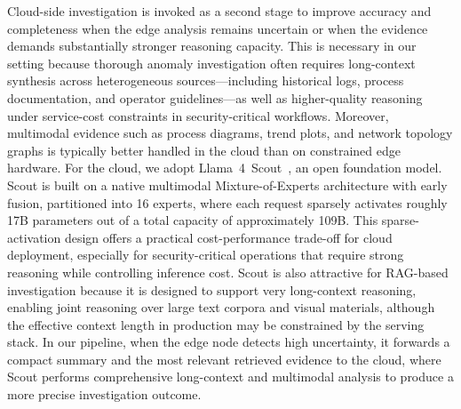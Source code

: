 \documentclass[pdflatex,sn-mathphys-num]{sn-jnl}%
\theoremstyle{thmstyleone}
\theoremstyle{thmstyletwo}%
\theoremstyle{thmstylethree}%
\begin{document}
Cloud-side investigation is invoked as a second stage to improve accuracy and completeness when the edge analysis remains uncertain or when the evidence demands substantially stronger reasoning capacity. This is necessary in our setting because thorough anomaly investigation often requires long-context synthesis across heterogeneous sources---including historical logs, process documentation, and operator guidelines---as well as higher-quality reasoning under service-cost constraints in security-critical workflows. Moreover, multimodal evidence such as process diagrams, trend plots, and network topology graphs is typically better handled in the cloud than on constrained edge hardware. For the cloud, we adopt Llama~4~Scout~\cite{abdullah2025evolution}, an open foundation model. Scout is built on a native multimodal Mixture-of-Experts architecture with early fusion, partitioned into 16 experts, where each request sparsely activates roughly 17B parameters out of a total capacity of approximately 109B. This sparse-activation design offers a practical cost-performance trade-off for cloud deployment, especially for security-critical operations that require strong reasoning while controlling inference cost. Scout is also attractive for RAG-based investigation because it is designed to support very long-context reasoning, enabling joint reasoning over large text corpora and visual materials, although the effective context length in production may be constrained by the serving stack. In our pipeline, when the edge node detects high uncertainty, it forwards a compact summary and the most relevant retrieved evidence to the cloud, where Scout performs comprehensive long-context and multimodal analysis to produce a more precise investigation outcome.
\end{document}
